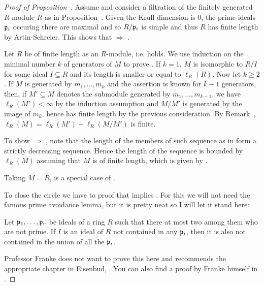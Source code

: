 \documentclass[a4paper,parskip=half,numbers=enddot, DIV=12]{scrreprt}
\begin{document}
\begin{proof}[Proof of Proposition~]
    Assume  and consider a filtration of the finitely generated $R$-module $R$ as in Proposition~. Given the Krull dimension is $0$, the prime ideals $\mathfrak{p}_i$ occuring there are maximal and so $R/\mathfrak{p}_i$ is simple and thus $R$ has finite length by Artin-Schreier. This shows that  $\Rightarrow$ .
    
    Let $R$ be of finite length as an $R$-module, i.e.  holds. We use induction on the minimal number $k$ of generators of $M$ to prove . If $k=1$, $M$ is isomorphic to $R/I$ for some ideal $I\subseteq R$ and its length is smaller or equal to $\ell_R(R)$. Now let $k\geq 2$. If $M$ is generated by $m_1,\ldots, m_k$ and the assertion is known for $k-1$ generators, then, if $M'\subseteq M$ denotes the submodule generated by $m_1,\ldots, m_{k-1}$, we have $\ell_R(M') < \infty$ by the induction assumption and $M/M'$ is generated by the image of $m_k$, hence has finite length by the previous consideration. By Remark~, $\ell_R(M)=\ell_R(M')+\ell_R(M/M')$ is finite.
    
    To show  $\Rightarrow$ , note that the length of the members of such sequence as in  form a strictly decreasing sequence. Hence the length of the sequence is bounded by $\ell_R(M)$ assuming that $M$ is of finite length, which is given by .
    
    Taking $M=R$,  is a special case of .
    
    To close the circle we have to proof that  implies . For this we will not need the famous prime avoidance lemma, but it is pretty neat so I will let it stand here:
    
    \begin{lem}
        Let $\mathfrak{p}_1,\ldots, \mathfrak{p}_r$ be ideals of a ring $R$ such that there at most two among them who are not prime. If $I$ is an ideal of $R$ not contained in any $\mathfrak{p}_i$, then it is also not contained in the union of all the $\mathfrak{p}_i$. 
    \end{lem}
    Professor Franke does not want to prove this here and recommends the appropriate chapter in Eisenbud, \cite[Section~3.2]{eisenbudCommAlg}. You can also find a proof by Franke himself in \cite[Lemma~2.5.1]{alg1}.
    

\end{proof}
\end{document}

